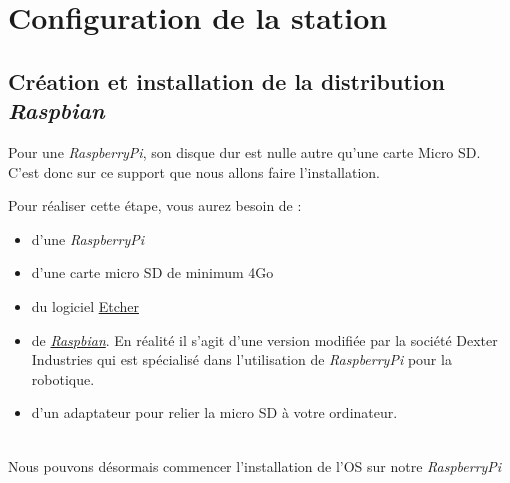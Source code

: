 \chapter{Configuration de la station}

\section{Création et installation de la distribution \textit{Raspbian}}

Pour une \textit{RaspberryPi}, son disque dur est nulle autre qu'une carte Micro SD. C'est donc sur ce support que nous allons faire l'installation.

Pour réaliser cette étape, vous aurez besoin de :
\begin{itemize}
	\item d'une \textit{RaspberryPi}
	\item d'une carte micro SD de minimum 4Go
	\item du logiciel \href{etcher.io}{Etcher}
	\item de \href{https://sourceforge.net/projects/dexterindustriesraspbianflavor/}{\textit{Raspbian}}. En réalité il s'agit d'une version modifiée par la société Dexter Industries qui est spécialisé dans l'utilisation de \textit{RaspberryPi} pour la robotique.
	\item d'un adaptateur pour relier la micro SD à votre ordinateur.
\end{itemize}\\
Nous pouvons désormais commencer l'installation de l'OS sur notre \textit{RaspberryPi}


